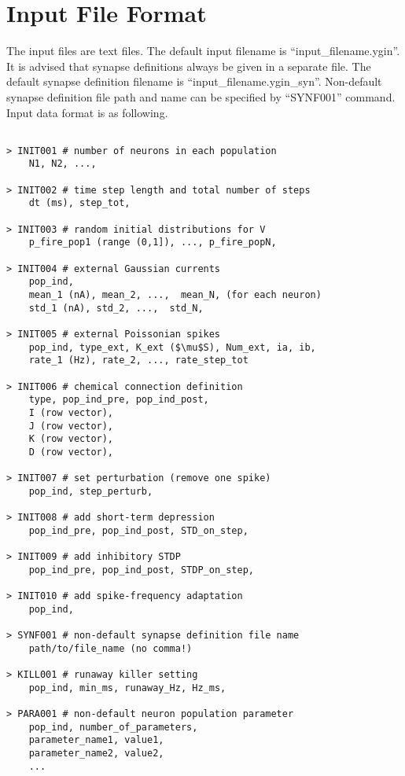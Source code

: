 \documentclass{article}
\begin{document}
\section{Input File Format}

The input files are text files.
The default input filename is ``input\_filename.ygin''.
It is advised that synapse definitions always be given in a separate file.
The default synapse definition filename is ``input\_filename.ygin\_syn''.
Non-default synapse definition file path and name can be specified by ``SYNF001'' command.
Input data format is as following.




\begin{lstlisting}[mathescape]

> INIT001 # number of neurons in each population
	N1, N2, ...,

> INIT002 # time step length and total number of steps
	dt (ms), step_tot,

> INIT003 # random initial distributions for V
	p_fire_pop1 (range (0,1]), ..., p_fire_popN, 

> INIT004 # external Gaussian currents
	pop_ind, 
	mean_1 (nA), mean_2, ...,  mean_N, (for each neuron)
	std_1 (nA), std_2, ...,  std_N, 

> INIT005 # external Poissonian spikes
	pop_ind, type_ext, K_ext ($\mu$S), Num_ext, ia, ib,
	rate_1 (Hz), rate_2, ..., rate_step_tot

> INIT006 # chemical connection definition
	type, pop_ind_pre, pop_ind_post,
	I (row vector),
	J (row vector),
	K (row vector),
	D (row vector),

> INIT007 # set perturbation (remove one spike)
	pop_ind, step_perturb,

> INIT008 # add short-term depression
	pop_ind_pre, pop_ind_post, STD_on_step,

> INIT009 # add inhibitory STDP
	pop_ind_pre, pop_ind_post, STDP_on_step,
	
> INIT010 # add spike-frequency adaptation 
	pop_ind,
	
> SYNF001 # non-default synapse definition file name
	path/to/file_name (no comma!)

> KILL001 # runaway killer setting
	pop_ind, min_ms, runaway_Hz, Hz_ms,

> PARA001 # non-default neuron population parameter
	pop_ind, number_of_parameters,
	parameter_name1, value1,
	parameter_name2, value2,
	...
 

\end{lstlisting}
\end{document}
